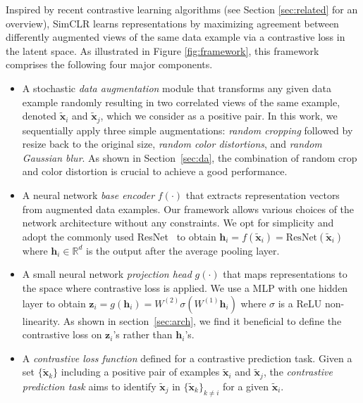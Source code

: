 \documentclass{article}
\begin{document}
Inspired by recent contrastive learning algorithms (see Section \ref{sec:related} for an overview), SimCLR learns representations by maximizing agreement between differently augmented views of the same data example via a contrastive loss in the latent space. As illustrated in Figure \ref{fig:framework}, this framework comprises the following four major components.
\begin{itemize}[topsep=0pt, partopsep=0pt, leftmargin=13pt, parsep=0pt, itemsep=4pt]
    \item A stochastic \textit{data augmentation} module that transforms any given data example randomly 
    resulting in two correlated views of the same example, denoted $\tilde{\bm x}_i$ and $\tilde{\bm x}_j$, which we consider as a positive pair.
    In this work, we sequentially apply three simple augmentations: \textit{random cropping} followed by resize back to the original size, \textit{random color distortions}, and \textit{random Gaussian blur}. As shown in Section~\ref{sec:da}, the combination of random crop and color distortion is crucial to achieve a good performance.
    \item A neural network \textit{base encoder} $f(\cdot)$ that extracts representation vectors from augmented data examples.
    Our framework allows various choices of the network architecture without any constraints.
    We opt for simplicity and adopt the commonly used ResNet~\cite{he2016deep} to obtain $\bm h_i = f(\tilde{\bm x}_i) = \mathrm{ResNet}(\tilde{\bm x}_i)$ where $\bm h_i\in \mathbb{R}^d$ is the output after the average pooling layer.
    \item A small neural network \textit{projection head} $g(\cdot)$ that maps representations to the space where contrastive loss is applied.
    We use a MLP with one hidden layer to obtain $\bm z_i = g(\bm h_i)=W^{(2)}\sigma(W^{(1)}\bm h_i)$ where $\sigma$ is a ReLU non-linearity. As shown in section~\ref{sec:arch}, we find it beneficial
    to define the contrastive loss on $\bm z_i$'s rather than $\bm h_i$'s. 
    \item A \textit{contrastive loss function} defined for a contrastive prediction task. 
    Given a set $\{\tilde{\bm x}_k\}$ including a positive pair of examples $\tilde{\bm x}_i$ and $\tilde{\bm x}_j$, the \textit{contrastive prediction task} aims to identify $\tilde{\bm x}_j$ in $\{\tilde{\bm x}_k\}_{k\ne i}$ for a given $\tilde{\bm x}_i$.
\end{itemize}
\end{document}
